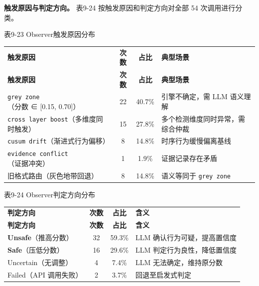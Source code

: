\documentclass[a4paper]{ctexart}
\makeatletter
\renewcommand{\_}{%
  \ifmmode
    \nfss@text{\textunderscore}%
  \else
    \textunderscore\discretionary{}{}{}%
  \fi}
\makeatother
\begin{document}
\textbf{触发原因与判定方向。} 表9-24 按触发原因和判定方向对全部 54 次调用进行分类。




\medskip
{\centering\small
表9-23 Observer触发原因分布\par
\vspace{3pt}
\setlength{\tabcolsep}{6pt}
\renewcommand{\arraystretch}{1.1}
\begin{longtable}{>{\raggedright\arraybackslash}p{4.9cm} c c >{\raggedright\arraybackslash}p{4.9cm}}
\hline
\textbf{触发原因} & \textbf{次数} & \textbf{占比} & \textbf{典型场景} \\*
\hline
\endfirsthead
\hline
\textbf{触发原因} & \textbf{次数} & \textbf{占比} & \textbf{典型场景} \\
\hline
\endhead
\hline
\endfoot
\hline
\endlastfoot
\texttt{grey\_zone}（分数 ∈ [0.15, 0.70]） & 22 & 40.7\% & 引擎不确定，需 LLM 语义理解 \\*
\hline
\texttt{cross\_layer\_boost}（多维度同时触发） & 15 & 27.8\% & 多个检测维度同时异常，需综合仲裁 \\
\hline
\texttt{cusum\_drift}（渐进式行为偏移） & 8 & 14.8\% & 时序行为缓慢偏离基线 \\
\hline
\texttt{evidence\_conflict}（证据冲突） & 1 & 1.9\% & 证据记录存在矛盾 \\
\hline
旧格式路由（灰色地带回退） & 8 & 14.8\% & 语义等同于 \texttt{grey\_zone} \\
\hline
\end{longtable}
\par}





\medskip
{\centering\small
表9-24 Observer判定方向分布\par
\vspace{3pt}
\setlength{\tabcolsep}{6pt}
\renewcommand{\arraystretch}{1.1}
\begin{longtable}{>{\raggedright\arraybackslash}p{4.9cm} c c >{\raggedright\arraybackslash}p{4.9cm}}
\hline
\textbf{判定方向} & \textbf{次数} & \textbf{占比} & \textbf{含义} \\*
\hline
\endfirsthead
\hline
\textbf{判定方向} & \textbf{次数} & \textbf{占比} & \textbf{含义} \\
\hline
\endhead
\hline
\endfoot
\hline
\endlastfoot
\textbf{Unsafe}（推高分数） & 32 & 59.3\% & LLM 确认行为可疑，提高置信度 \\*
\hline
\textbf{Safe}（压低分数） & 16 & 29.6\% & LLM 判定行为良性，降低置信度 \\
\hline
Uncertain（无调整） & 4 & 7.4\% & LLM 无法确定，维持原分数 \\
\hline
Failed（API 调用失败） & 2 & 3.7\% & 回退至启发式判定 \\
\hline
\end{longtable}
\par}
\end{document}
